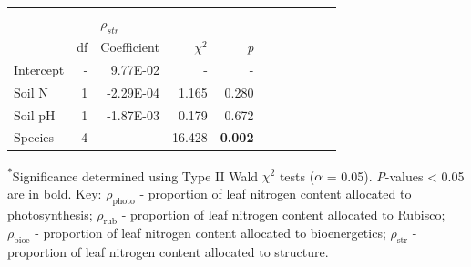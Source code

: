 \begin{landscape}
\begin{table}
{\begin{tabular}{p{2.5cm}p{0.5cm}p{2cm}p{1.5cm}p{1.5cm}p{2cm}p{1.5cm}p{1.5cm}p{2cm}p{1.5cm}p{1.5cm}}
        &&&&&&&&&&
        \\

        && \multicolumn{3}{l}{$\rho_{str}$} &&&&& \\
        \hline
        & \multicolumn{1}{r}{df}
        & \multicolumn{1}{r}{Coefficient} & \multicolumn{1}{r}{$\chi^{2}$} & \multicolumn{1}{r}{\textit{p}} 
        \\
        \hline

        Intercept & \multicolumn{1}{r}{-}
        & \multicolumn{1}{r}{9.77E-02} & \multicolumn{1}{r}{-} & \multicolumn{1}{r}{-}
        &&&&&&
        \\

        Soil N & \multicolumn{1}{r}{1}
        & \multicolumn{1}{r}{-2.29E-04}  & \multicolumn{1}{r}{1.165} & \multicolumn{1}{r}{0.280}
        &&&&&& 
        \\

        Soil pH & \multicolumn{1}{r}{1}
        & \multicolumn{1}{r}{-1.87E-03} & \multicolumn{1}{r}{0.179} & \multicolumn{1}{r}{0.672}
        &&&&&& 
        \\

        Species & \multicolumn{1}{r}{4}
        & \multicolumn{1}{r}{-} & \multicolumn{1}{r}{16.428} & \multicolumn{1}{r}{\textbf{0.002}}
        &&&&&&
        \\
        \hline
    \end{tabular}}
    \label{tab:table3.3}
\end{table}
\begin{singlespace}
\noindent \textsuperscript{$*$}Significance determined using Type II Wald $\chi^{2}$ tests ($\alpha$ = 0.05). \textit{P}-values < 0.05 are in bold. Key: $\rho_\mathrm{photo}$ - proportion of leaf nitrogen content allocated to photosynthesis; $\rho_\mathrm{rub}$ - proportion of leaf nitrogen content allocated to Rubisco; $\rho_\mathrm{bioe}$ - proportion of leaf nitrogen content allocated to bioenergetics; $\rho_\mathrm{str}$ - proportion of leaf nitrogen content allocated to structure. 
\end{singlespace}
\end{landscape}
\clearpage

